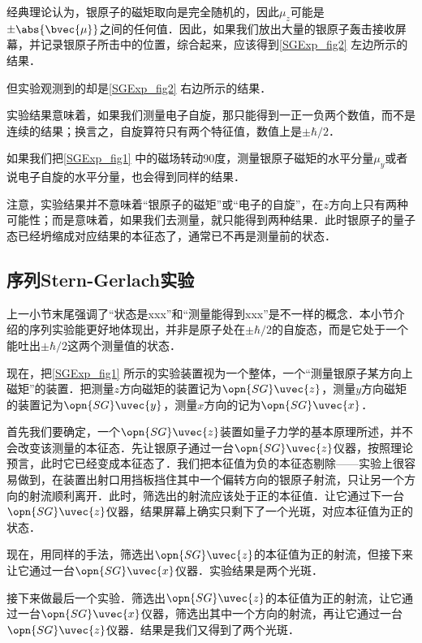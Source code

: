 经典理论认为，银原子的磁矩取向是完全随机的，因此$\mu_z$可能是$\pm\abs{\bvec{\mu}}$之间的任何值．因此，如果我们放出大量的银原子轰击接收屏幕，并记录银原子所击中的位置，综合起来，应该得到\autoref{SGExp_fig2} 左边所示的结果．

但实验观测到的却是\autoref{SGExp_fig2} 右边所示的结果．


实验结果意味着，如果我们测量电子自旋，那只能得到一正一负两个数值，而不是连续的结果；换言之，自旋算符只有两个特征值，数值上是$\pm\hbar/2$．


如果我们把\autoref{SGExp_fig1} 中的磁场转动90度，测量银原子磁矩的水平分量$\mu_y$或者说电子自旋的水平分量，也会得到同样的结果．



注意，实验结果并不意味着“银原子的磁矩”或“电子的自旋”，在$z$方向上只有两种可能性；而是意味着，如果我们去测量，就只能得到两种结果．此时银原子的量子态已经坍缩成对应结果的本征态了，通常已不再是测量前的状态．



\subsection{序列Stern-Gerlach实验}

上一小节末尾强调了“状态是xxx”和“测量能得到xxx”是不一样的概念．本小节介绍的序列实验能更好地体现出，并非是原子处在$\pm\hbar/2$的自旋态，而是它处于一个能吐出$\pm\hbar/2$这两个测量值的状态．

现在，把\autoref{SGExp_fig1} 所示的实验装置视为一个整体，一个“测量银原子某方向上磁矩”的装置．把测量$z$方向磁矩的装置记为$\opn{SG}\uvec{z}$，测量$y$方向磁矩的装置记为$\opn{SG}\uvec{y}$，测量$x$方向的记为$\opn{SG}\uvec{x}$．

首先我们要确定，一个$\opn{SG}\uvec{z}$装置如量子力学的基本原理所述，并不会改变该测量的本征态．先让银原子通过一台$\opn{SG}\uvec{z}$仪器，按照理论预言，此时它已经变成本征态了．我们把本征值为负的本征态剔除——实验上很容易做到，在装置出射口用挡板挡住其中一个偏转方向的银原子射流，只让另一个方向的射流顺利离开．此时，筛选出的射流应该处于正的本征值．让它通过下一台$\opn{SG}\uvec{z}$仪器，结果屏幕上确实只剩下了一个光斑，对应本征值为正的状态．

现在，用同样的手法，筛选出$\opn{SG}\uvec{z}$的本征值为正的射流，但接下来让它通过一台$\opn{SG}\uvec{x}$仪器．实验结果是两个光斑．

接下来做最后一个实验．筛选出$\opn{SG}\uvec{z}$的本征值为正的射流，让它通过一台$\opn{SG}\uvec{x}$仪器，筛选出其中一个方向的射流，再让它通过一台$\opn{SG}\uvec{z}$仪器．结果是我们又得到了两个光斑．



